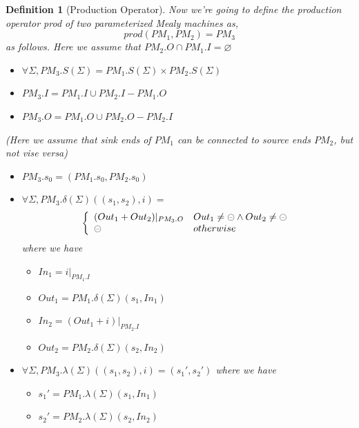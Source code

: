 \documentclass[conference, a4paper]{IEEEtran}
\newtheorem{definition}{Definition}
\newcommand{\rblock}[0]{\circleddash}
\begin{document}
\begin{definition}[Production Operator]
  Now we're going to define the production operator \emph{prod} of two parameterized Mealy machines as,
  \[
  prod(PM_1,PM_2)=PM_3
  \]
  as follows. Here we assume that $PM_2.O\cap PM_1.I=\varnothing$
  \begin{itemize}
  	\item[-] $\forall\Sigma, PM_3.S(\Sigma)=PM_1.S(\Sigma)\times PM_2.S(\Sigma)$
    \item[-] $PM_3.I=PM_1.I\cup PM_2.I-PM_1.O$
    \item[-] $PM_3.O=PM_1.O\cup PM_2.O-PM_2.I$
  \end{itemize}
  \emph{(Here we assume that sink ends of $PM_1$ can be connected to source ends $PM_2$, but not
  vise versa)}
  \begin{itemize}
    \item[-] $PM_3.s_0=(PM_1.s_0, PM_2.s_0)$
    \item[-] $\forall\Sigma, PM_3.\delta(\Sigma)((s_1,s_2), i)=$
      \begin{displaymath}
        \left\{
        \begin{array}[ht]{ll}
          (Out_1 + Out_2)|_{PM_3.O} & Out_1\neq\rblock\land Out_2\neq\rblock \\
          \rblock & otherwise \\
        \end{array}
        \right.
      \end{displaymath}
      where we have
      \begin{itemize}
        \item[*] $In_1 = i|_{PM_1.I}$
        \item[*] $Out_1 = PM_1.\delta(\Sigma)(s_1,In_1)$
        \item[*] $In_2 = (Out_1 + i)|_{PM_2.I}$
        \item[*] $Out_2 = PM_2.\delta(\Sigma)(s_2,In_2)$
      \end{itemize}
    \item[-] $\forall\Sigma, PM_3. \lambda(\Sigma)((s_1,s_2),i)=(s_1',s_2')$
      where we have
      \begin{itemize}
        \item[*] $s_1' = PM_1.\lambda(\Sigma)(s_1,In_1)$
        \item[*] $s_2' = PM_2.\lambda(\Sigma)(s_2,In_2)$
      \end{itemize}
  \end{itemize}
\end{definition}
\end{document}
